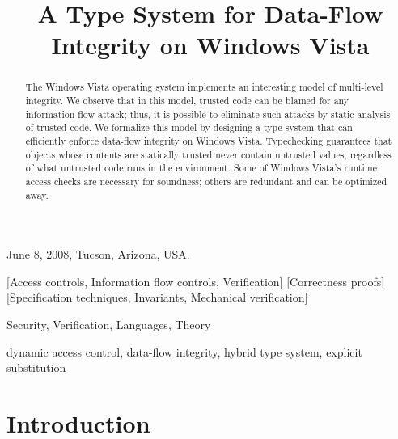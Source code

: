 \documentclass{sigplanconf}
\title{A Type System for Data-Flow Integrity on Windows Vista}
\begin{document}
 {June 8, 2008, Tucson, Arizona, USA.}
\maketitle







\begin{abstract} 


The Windows Vista operating system implements an interesting model of multi-level integrity.  
We observe that in this model, trusted code can be blamed for any information-flow attack; thus, it is possible to eliminate such attacks by static analysis of trusted code. We formalize this model by designing a type system 
that can efficiently enforce data-flow integrity on Windows Vista. Typechecking guarantees that objects whose
contents are statically trusted never contain untrusted values, regardless of
what untrusted code runs in the environment. 
Some of Windows Vista's runtime access checks are necessary for soundness; others are redundant and can be optimized away. 
\end{abstract}



[Access controls, Information flow controls, Verification]
[Correctness proofs]
[Specification techniques, Invariants, Mechanical verification]


\terms
Security, Verification, Languages, Theory

\keywords
dynamic access control, data-flow integrity, hybrid type system, explicit substitution

\section{Introduction}\label{intro}
\end{document}
